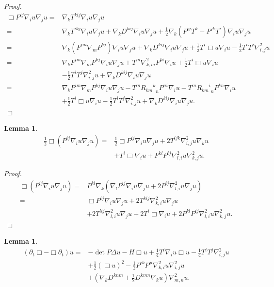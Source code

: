 \documentclass{amsart}
\newtheorem{lemma}[theorem]{Lemma}
\theoremstyle{definition}
\theoremstyle{remark}
\numberwithin{equation}{section}
\begin{document}
\begin{proof}
\begin{align*}
\Box P^{ij}\nabla_iu\nabla_ju=&\nabla_kT^{kij}\nabla_iu\nabla_ju\\
=&\nabla_kT^{ikj}\nabla_iu\nabla_ju+\nabla_k D^{kij}\nabla_iu\nabla_ju+\frac{1}{2}\nabla_k\left(P^{ij}T^k-P^{jk}T^i\right)\nabla_iu\nabla_ju\\
=&\nabla_k(P^{im}\nabla_mP^{kj})\nabla_iu\nabla_ju+\nabla_k D^{kij}\nabla_iu\nabla_ju+\frac{1}{2}T^i\Box u\nabla_iu-\frac{1}{2}T^iT^j\nabla^2_{i,j}u\\
=&\nabla_kP^{im}\nabla_mP^{kj}\nabla_iu\nabla_ju+T^m\nabla^2_{k,m}P^{ki}\nabla_iu+\frac{1}{2}T^i\Box u\nabla_iu\\
&-\frac{1}{2}T^iT^j\nabla^2_{i,j}u+\nabla_k D^{kij}\nabla_iu\nabla_ju\\
=&\nabla_kP^{im}\nabla_mP^{kj}\nabla_iu\nabla_ju-T^m{{R_{km}}^k}_nP^{ni}\nabla_iu-T^m{{R_{km}}^i}_nP^{kn}\nabla_iu\\
&+\frac{1}{2}T^i\Box u\nabla_iu-\frac{1}{2}T^iT^j\nabla^2_{i,j}u+\nabla_k D^{kij}\nabla_iu\nabla_ju.
\end{align*}
\end{proof}
\begin{lemma}
\begin{align*}
\frac{1}{2}\Box\left(P^{ij}\nabla_i u\nabla_ju\right)=&\frac{1}{2}\Box P^{ij}\nabla_i u\nabla_ju+2T^{ijk}\nabla^2_{i,j}u\nabla_ku\\
&+T^i\Box\nabla_i u+P^{kl}P^{ij}\nabla^2_{l,i}u\nabla^2_{k,j}u.
\end{align*}
\end{lemma}
\begin{proof}
\begin{align*}
\Box\left(P^{ij}\nabla_i u\nabla_ju\right)=&P^{kl}\nabla_k\left(\nabla_lP^{ij}\nabla_iu\nabla_ju+2P^{ij}\nabla^2_{l,i}u\nabla_ju\right)\\
=&\Box P^{ij}\nabla_i u\nabla_ju+2T^{kij}\nabla^2_{k,i}u\nabla_ju\\
&+2T^{lij}\nabla^2_{l,i}u\nabla_ju+2T^i\Box\nabla_i u+2P^{kl}P^{ij}\nabla^2_{l,i}u\nabla^2_{k,j}u.
\end{align*}
\end{proof}
\begin{lemma}
\begin{align*}
(\partial_t \Box-\Box\partial_t) u=
&-\det P\Delta u-H\Box u+\frac{1}{4}T^i\nabla_iu\Box u-\frac{1}{4}T^iT^j\nabla^2_{i,j}u\\
&+\frac{1}{2}(\Box u)^2-\frac{1}{2}P^{ik}P^{jl}\nabla^2_{k,l}u\nabla^2_{i,j}u\\
&+\left(\nabla_kD^{knm}+\frac{1}{2}D^{kmn}\nabla_ku\right)\nabla^2_{m,n}u.
\end{align*}
\end{lemma}
\end{document}
